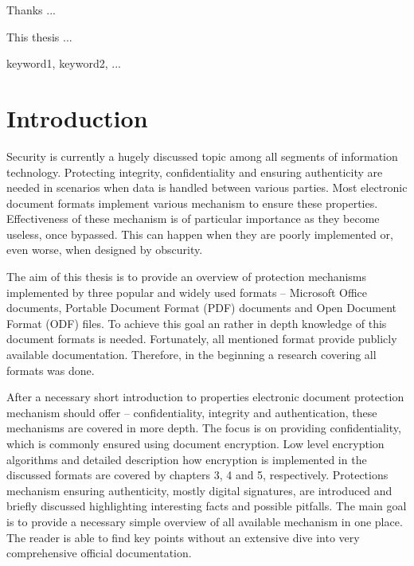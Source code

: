 \documentclass[11pt,oneside]{fithesis2}
\begin{document}
\FrontMatter
\ThesisTitlePage

\begin{ThesisDeclaration}
\DeclarationText
\AdvisorName
\end{ThesisDeclaration}

\begin{ThesisThanks}
Thanks ...
\end{ThesisThanks}

\begin{ThesisAbstract}
This thesis ...  
\end{ThesisAbstract}

\begin{ThesisKeyWords}
keyword1, keyword2, ...
\end{ThesisKeyWords}

\MainMatter

\tableofcontents 
\chapter{Introduction}

Security is currently a hugely discussed topic among all segments of information technology. Protecting integrity, confidentiality and ensuring authenticity are needed in scenarios when data is handled between various parties. Most electronic document formats implement various mechanism to ensure these properties. Effectiveness of these mechanism is of particular importance as they become useless, once bypassed. This can happen when they are poorly implemented or, even worse, when designed by obscurity.

The aim of this thesis is to provide an overview of protection mechanisms implemented by three popular and widely used formats -- Microsoft Office documents, Portable Document Format (PDF) documents and Open Document Format (ODF) files. To achieve this goal an rather in depth knowledge of this document formats is needed. Fortunately, all mentioned format provide publicly available documentation. Therefore, in the beginning a research covering all formats was done. 

After a necessary short introduction to properties electronic document protection mechanism should offer -- confidentiality, integrity and authentication, these mechanisms are covered in more depth. The focus is on providing confidentiality, which is commonly ensured using document encryption. Low level encryption algorithms and detailed description how encryption is implemented in the discussed formats are covered by chapters 3, 4 and 5, respectively. Protections mechanism ensuring authenticity, mostly digital signatures, are introduced and briefly discussed highlighting interesting facts and possible pitfalls. The main goal is to provide a necessary simple overview of all available mechanism in one place. The reader is able to find key points without an extensive dive into very comprehensive official documentation. 
\end{document}
